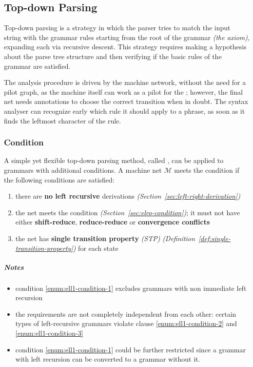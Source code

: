 \documentclass[english]{article}
\begin{document}
\subsection{Top-down Parsing}
\label{sec:top-down}

Top-down parsing is a strategy in which the parser tries to match the input string with the grammar rules starting from the root of the grammar \textit{(the axiom)}, expanding each \RP via recursive descent.
This strategy requires making a hypothesis about the parse tree structure and then verifying if the basic rules of the grammar are satisfied.

\bigskip
The analysis procedure is driven by the machine network, without the need for a pilot graph, as the machine itself can work as a pilot for the \PDA;
however, the final net needs annotations to choose the correct transition when in doubt.
The syntax analyser can recognize early which rule it should apply to a phrase, as soon as it finds the leftmost character of the rule.

\subsubsection[ELL(1) Condition]{\ello Condition}

A simple yet flexible top-down parsing method, called \ello, can be applied to \elro grammars with additional conditions.
A machine net \(\mathcal{M}\) meets the \ello condition if the following conditions are satisfied:

\begin{enumerate}[label=\arabic*., ref=(\arabic*)]
  \item\label{enum:ell1-condition-1} there are \textbf{no left recursive} derivations \textit{(Section~\ref{sec:left-right-derivation})}
  \item\label{enum:ell1-condition-2} the net meets the \elro condition \textit{(Section~\ref{sec:elro-condition})}; it must not have either \textbf{shift-reduce}, \textbf{reduce-reduce} or \textbf{convergence conflicts}
  \item\label{enum:ell1-condition-3} the net has \textbf{single transition property} \textit{(STP)} \textit{(Definition~\ref{def:single-transition-property})} for each state
\end{enumerate}

\subparagraph*{Notes}

\begin{itemize}
  \item condition \ref{enum:ell1-condition-1} excludes grammars with non immediate left recursion
  \item the requirements are not completely independent from each other: certain types of left-recursive grammars violate clause \ref{enum:ell1-condition-2} and \ref{enum:ell1-condition-3}
  \item condition \ref{enum:ell1-condition-1} could be further restricted since a grammar with left recursion can be converted to a grammar without it.
\end{itemize}
\end{document}

